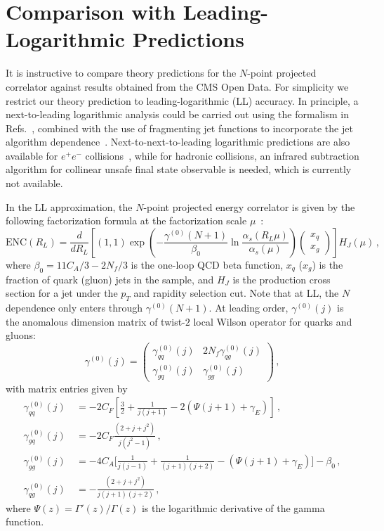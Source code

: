\documentclass[aps,prl,twocolumn,showpacs,10pt,superscriptaddress,preprintnumbers,nofootinbib,longbibliography]{revtex4-1}
\newcommand{\nn}{\nonumber}
\begin{document}
\section{Comparison with Leading-Logarithmic Predictions}
\label{sec:LL}

It is instructive to compare theory predictions for the $N$-point projected correlator against results obtained from the CMS Open Data.
%
For simplicity we restrict our theory prediction to leading-logarithmic (LL) accuracy.
%
In principle, a next-to-leading logarithmic analysis could be carried out using the formalism in Refs.~\cite{Chen:2020vvp,Dixon:2019uzg}, combined with the use of fragmenting jet functions to incorporate the jet algorithm dependence~\cite{Procura:2009vm,Kang:2016ehg,Kang:2016mcy}.
%
Next-to-next-to-leading logarithmic predictions are also available for $e^+e^-$ collisions~\cite{Dixon:2019uzg}, while for hadronic collisions, an infrared subtraction algorithm for collinear unsafe final state observable is needed, which is currently not available. 



In the LL approximation, the $N$-point projected energy correlator is given by the following factorization formula at the factorization scale $\mu$~\cite{Chen:2020vvp}:
\begin{equation}
\text{ENC}(R_L) = \frac{d}{dR_L} \left[ 
(1,1) \exp\left( - \frac{\gamma^{(0)}(N+1)}{\beta_0} \ln \frac{\alpha_s(R_L \mu)}{\alpha_s(\mu)} \right)
\begin{pmatrix}
x_q
\\
x_g
\end{pmatrix}
\right] H_J(\mu) \,,
\label{eq:LL}
\end{equation}
where $\beta_0 = 11 C_A/3 - 2N_f/3$ is the one-loop QCD beta function, $x_q$ ($x_g$) is the fraction of quark (gluon) jets in the sample, and $H_J$ is the production cross section for a jet under the $p_T$ and rapidity selection cut.
%
Note that at LL, the $N$ dependence only enters through $\gamma^{(0)}(N+1)$.
%
At leading order, $\gamma^{(0)}(j)$ is the anomalous dimension matrix of twist-$2$ local Wilson operator for quarks and gluons:
%
\begin{equation}
\gamma^{(0)}(j) = 
\begin{pmatrix}
\gamma_{qq}^{(0)}(j) & 2N_f \gamma_{qg}^{(0)}(j)
\\
\gamma_{gq}^{(0)}(j) & \gamma_{gg}^{(0)}(j)
\end{pmatrix} \,,
\end{equation}
%
with matrix entries given by
%
\begin{align}
  \label{eq:QCDAD}
  \gamma_{ qq}^{(0)}(j)&\ = -2 C_F \left[ \frac{3}{2} + \frac{1}{j (j+1)} - 2 (\Psi(j+1) + \gamma_E ) \right] \,,
\nn\\
\gamma_{gq}^{(0)}(j)&\ = -2 C_F \frac{ (2 + j + j^2)}{j (j^2 - 1)} \,,
\nn\\
\gamma_{gg}^{(0)}(j)&\ = -4 C_A \bigg[ \frac{1}{j (j-1)} + \frac{1}{(j+1) (j+2)}
  - (\Psi(j+1) + \gamma_E)  \bigg] 
- \beta_0 \,,
\nn\\
\gamma_{qg}^{(0)}(j) &\ = - \frac{(2 + j + j^2)}{j (j+1) (j+2)} \,,
\end{align}
%
where $\Psi(z) = \Gamma'(z)/\Gamma(z)$ is the logarithmic derivative of the gamma function.
\end{document}
